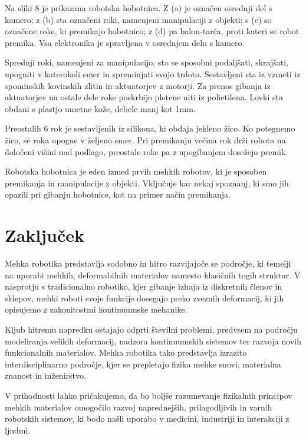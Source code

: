 \documentclass[12pt ]{article}
\begin{document}
\noindent Na sliki 8 je prikazana robotska hobotnica. Z (a) je označen osrednji del s kamero; z (b) sta označeni roki, namenjeni manipulaciji z objekti; s (c) so označene roke, ki premikajo hobotnico; z (d) pa balon-tarča, proti kateri se robot premika. Vsa elektronika je spravljena v osrednjem delu s kamero.

Sprednji roki, namenjeni za manipulacijo, sta se sposobni podaljšati, skrajšati, upogniti v katerokoli smer in spreminjati svojo trdoto. Sestavljeni sta iz vzmeti iz spominskih kovinskih zlitin in aktuatorjev z motorji. Za prenos gibanja iz aktuatorjev na ostale dele roke poskrbijo pletene niti iz polietilena. Lovki sta obdani s plastjo umetne kože, debele manj kot 1mm.

Preostalih 6 rok je sestavljenih iz silikona, ki obdaja jekleno žico. Ko potegnemo žico, se roka upogne v željeno smer. Pri premikanju večina rok drži robota na določeni višini nad podlago, preostale roke pa z upogibanjem dosežejo premik.

Robotska hobotnica je eden izmed prvih mehkih robotov, ki je sposoben premikanja in manipulacije z objekti. Vključuje kar nekaj spoznanj, ki smo jih opazili pri gibanju hobotnice, kot na primer način premikanja\cite{cianchetti2015bioinspired}.

\section{Zaključek}
Mehka robotika predstavlja sodobno in hitro razvijajoče se področje, ki temelji na uporabi mehkih, deformabilnih materialov namesto klasičnih togih struktur. V nasprotju s tradicionalno robotiko, kjer gibanje izhaja iz diskretnih členov in sklepov, mehki roboti svoje funkcije dosegajo preko zveznih deformacij, ki jih opisujemo z zakonitostmi kontinuumske mehanike.

Kljub hitremu napredku ostajajo odprti številni problemi, predvsem na področju modeliranja velikih deformacij, nadzora kontinuumskih sistemov ter razvoja novih funkcionalnih materialov. Mehka robotika tako predstavlja izrazito interdisciplinarno področje, kjer se prepletajo fizika mehke snovi, materialna znanost in inženirstvo.

V prihodnosti lahko pričakujemo, da bo boljše razumevanje fizikalnih principov mehkih materialov omogočilo razvoj naprednejših, prilagodljivih in varnih robotskih sistemov, ki bodo našli uporabo v medicini, industriji in interakciji z ljudmi.

\newpage
\printbibliography
\end{document}
